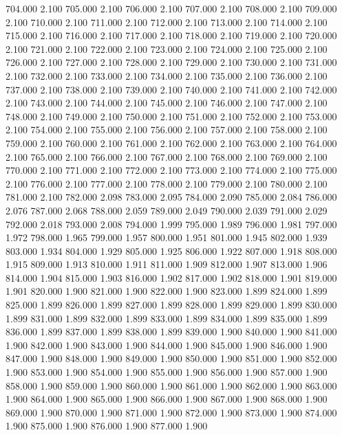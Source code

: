 704.000 2.100 
705.000 2.100 
706.000 2.100 
707.000 2.100 
708.000 2.100 
709.000 2.100 
710.000 2.100 
711.000 2.100 
712.000 2.100 
713.000 2.100 
714.000 2.100 
715.000 2.100 
716.000 2.100 
717.000 2.100 
718.000 2.100 
719.000 2.100 
720.000 2.100 
721.000 2.100 
722.000 2.100 
723.000 2.100 
724.000 2.100 
725.000 2.100 
726.000 2.100 
727.000 2.100 
728.000 2.100 
729.000 2.100 
730.000 2.100 
731.000 2.100 
732.000 2.100 
733.000 2.100 
734.000 2.100 
735.000 2.100 
736.000 2.100 
737.000 2.100 
738.000 2.100 
739.000 2.100 
740.000 2.100 
741.000 2.100 
742.000 2.100 
743.000 2.100 
744.000 2.100 
745.000 2.100 
746.000 2.100 
747.000 2.100 
748.000 2.100 
749.000 2.100 
750.000 2.100 
751.000 2.100 
752.000 2.100 
753.000 2.100 
754.000 2.100 
755.000 2.100 
756.000 2.100 
757.000 2.100 
758.000 2.100 
759.000 2.100 
760.000 2.100 
761.000 2.100 
762.000 2.100 
763.000 2.100 
764.000 2.100 
765.000 2.100 
766.000 2.100 
767.000 2.100 
768.000 2.100 
769.000 2.100 
770.000 2.100 
771.000 2.100 
772.000 2.100 
773.000 2.100 
774.000 2.100 
775.000 2.100 
776.000 2.100 
777.000 2.100 
778.000 2.100 
779.000 2.100 
780.000 2.100 
781.000 2.100 
782.000 2.098 
783.000 2.095 
784.000 2.090 
785.000 2.084 
786.000 2.076 
787.000 2.068 
788.000 2.059 
789.000 2.049 
790.000 2.039 
791.000 2.029 
792.000 2.018 
793.000 2.008 
794.000 1.999 
795.000 1.989 
796.000 1.981 
797.000 1.972 
798.000 1.965 
799.000 1.957 
800.000 1.951 
801.000 1.945 
802.000 1.939 
803.000 1.934 
804.000 1.929 
805.000 1.925 
806.000 1.922 
807.000 1.918 
808.000 1.915 
809.000 1.913 
810.000 1.911 
811.000 1.909 
812.000 1.907 
813.000 1.906 
814.000 1.904 
815.000 1.903 
816.000 1.902 
817.000 1.902 
818.000 1.901 
819.000 1.901 
820.000 1.900 
821.000 1.900 
822.000 1.900 
823.000 1.899 
824.000 1.899 
825.000 1.899 
826.000 1.899 
827.000 1.899 
828.000 1.899 
829.000 1.899 
830.000 1.899 
831.000 1.899 
832.000 1.899 
833.000 1.899 
834.000 1.899 
835.000 1.899 
836.000 1.899 
837.000 1.899 
838.000 1.899 
839.000 1.900 
840.000 1.900 
841.000 1.900 
842.000 1.900 
843.000 1.900 
844.000 1.900 
845.000 1.900 
846.000 1.900 
847.000 1.900 
848.000 1.900 
849.000 1.900 
850.000 1.900 
851.000 1.900 
852.000 1.900 
853.000 1.900 
854.000 1.900 
855.000 1.900 
856.000 1.900 
857.000 1.900 
858.000 1.900 
859.000 1.900 
860.000 1.900 
861.000 1.900 
862.000 1.900 
863.000 1.900 
864.000 1.900 
865.000 1.900 
866.000 1.900 
867.000 1.900 
868.000 1.900 
869.000 1.900 
870.000 1.900 
871.000 1.900 
872.000 1.900 
873.000 1.900 
874.000 1.900 
875.000 1.900 
876.000 1.900 
877.000 1.900 

